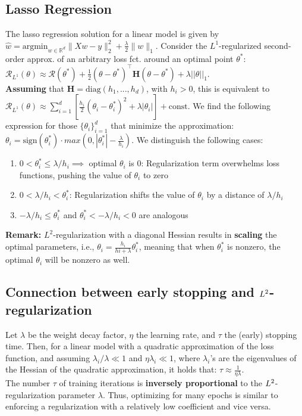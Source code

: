 \subsection{Lasso Regression}
The lasso regression solution for a linear model is given by \\
$\hat{w} = \text{argmin}_{\scriptscriptstyle w \in \mathbb{R}^d} \|Xw - y\|_2^2 + \frac{\lambda}{2} \|w\|_1$. Consider the $L^1$-regularized second-order approx. of an arbitrary loss fct.
 around an optimal point $\theta^*$: \\
$\mathcal{R}_{L^1}(\theta) \approx \mathcal{R}(\theta^*) + \frac{1}{2}(\theta-\theta^*)^\intercal \mathbf{H}(\theta-\theta^*)+\lambda||\theta||_1$.\\
\textbf{Assuming} that $\mathbf{H}=\text{diag}(h_1,...,h_d)$, with $h_i>0$, this is equivalent to $\mathcal{R}_{L^1}(\theta) \approx \sum_{i=1}^d \left[\frac{h_i}{2}(\theta_i - \theta_i^*)^2 + \lambda|\theta_i| \right] + \text{const.}$ We find the following expression for those $\{\theta_i\}_{i=1}^d$ that minimize the approximation: \\
$\theta_i=\text{sign}\left(\theta_i^*\right)\cdot max\left(0, \left|\theta_i^*\right| - \frac{\lambda}{h_i}\right)$. We distinguish the following cases: \\
\begin{enumerate}
    \item $0 < \theta_i^* \leq \lambda/h_i \implies $ optimal $\theta_i$ is 0: Regularization term overwhelms loss functions, pushing the value of $\theta_i$ to zero
    \item $0 <  \lambda/h_i < \theta_i^*$: Regularization shifts the value of $\theta_i$ by a distance of $\lambda/h_i$
    \item $-\lambda/h_i \leq \theta_i^*$ and $\theta_i^* < -\lambda/h_i <0$ are analogous
\end{enumerate}

\textbf{Remark:} $L^2$-regularization with a diagonal Hessian results in \textbf{scaling} the optimal parameters, i.e., $\theta_i=\frac{h_i}{hi+\lambda}\theta_i^*$, meaning that when $\theta_i^*$ is nonzero, the optimal $\theta_i$ will be nonzero as well.

\subsection{Connection between early stopping and $\textcolor{black}{L^2}$-regularization}
Let $\lambda$ be the weight decay factor, $\eta$ the learning rate, and $\tau$ the (early) stopping time. Then, for a linear model with a quadratic approximation of the loss function, and assuming $\lambda_i/\lambda \ll 1$ and $\eta\lambda_i \ll 1$, where $\lambda_i$'s are the eigenvalues of the Hessian of the quadratic approximation, it holds that: $\tau \approx \frac{1}{\eta \lambda}$. \\
\textrightarrow The number $\tau$ of training iterations is \textbf{inversely proportional} to the $\textcolor{black}{L^2}$-regularization parameter $\lambda$. Thus, optimizing for many epochs is similar to enforcing a regularization with a relatively low coefficient and vice versa.


